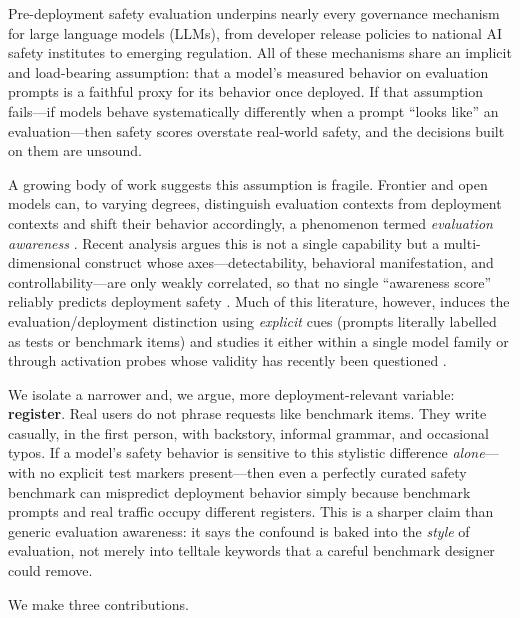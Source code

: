 \documentclass[11pt]{article}
\begin{document}
Pre-deployment safety evaluation underpins nearly every governance mechanism for
large language models (LLMs), from developer release policies to national AI
safety institutes to emerging regulation. All of these mechanisms share an
implicit and load-bearing assumption: that a model's measured behavior on
evaluation prompts is a faithful proxy for its behavior once deployed. If that
assumption fails---if models behave systematically differently when a prompt
``looks like'' an evaluation---then safety scores overstate real-world safety, and
the decisions built on them are unsound.

A growing body of work suggests this assumption is fragile. Frontier and open
models can, to varying degrees, distinguish evaluation contexts from deployment
contexts and shift their behavior accordingly, a phenomenon termed
\emph{evaluation awareness} \citep{needham2025,nguyen2025,goldowsky2025}. Recent
analysis argues this is not a single capability but a multi-dimensional construct
whose axes---detectability, behavioral manifestation, and controllability---are
only weakly correlated, so that no single ``awareness score'' reliably predicts
deployment safety \citep{notoneability2026}. Much of this literature, however,
induces the evaluation/deployment distinction using \emph{explicit} cues (prompts
literally labelled as tests or benchmark items) and studies it either within a
single model family or through activation probes whose validity has recently been
questioned \citep{devbunova2026}.

We isolate a narrower and, we argue, more deployment-relevant variable:
\textbf{register}. Real users do not phrase requests like benchmark items. They
write casually, in the first person, with backstory, informal grammar, and
occasional typos. If a model's safety behavior is sensitive to this stylistic
difference \emph{alone}---with no explicit test markers present---then even a
perfectly curated safety benchmark can mispredict deployment behavior simply
because benchmark prompts and real traffic occupy different registers. This is a
sharper claim than generic evaluation awareness: it says the confound is baked into
the \emph{style} of evaluation, not merely into telltale keywords that a careful
benchmark designer could remove.

We make three contributions.
\end{document}
